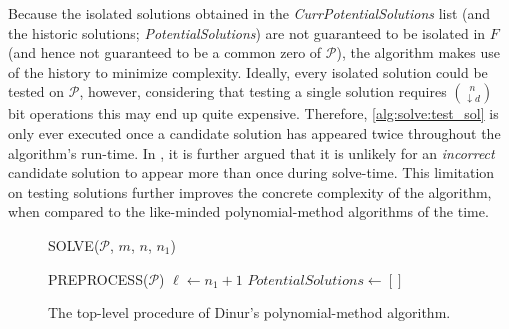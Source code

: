 Because the isolated solutions obtained in the \textit{CurrPotentialSolutions} list (and the historic solutions; \textit{PotentialSolutions}) are not guaranteed to be isolated in $F$ (and hence not guaranteed to be a common zero of $\mathcal{P}$), the algorithm makes use of the history to minimize complexity. Ideally, every isolated solution could be tested on $\mathcal{P}$, however, considering that testing a single solution requires $\binom{n}{\downarrow d}$ bit operations this may end up quite expensive. Therefore, \cref{alg:solve:test_sol} is only ever executed once a candidate solution has appeared twice throughout the algorithm's run-time. In \cite{eurocrypt-2021-30841}, it is further argued that it is unlikely for an \textit{incorrect} candidate solution to appear more than once during solve-time. This limitation on testing solutions further improves the concrete complexity of the algorithm, when compared to the like-minded polynomial-method algorithms of the time.
\begin{figure}[ht]
    \centering
    \begin{alg}
        \caption{SOLVE($\mathcal{P}$, $m$, $n$, $n_1$)}
        \label{alg:solve}
         \label{alg:solve:matrix}
        PREPROCESS($\mathcal{P}$)\; \label{alg:solve:preprocess}
        $\ell \gets n_1 + 1$\;
        $PotentialSolutions \gets []$\;
    \end{alg}
    \caption{The top-level procedure of Dinur's polynomial-method algorithm.}
\end{figure}

